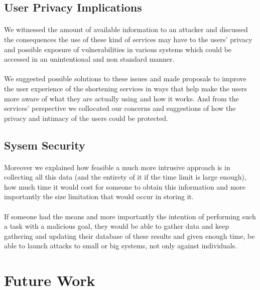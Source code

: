 \documentclass[12pt]{article}
\begin{document}
\subsection{User Privacy Implications}

\paragraph{}
We witnessed the amount of available information to an attacker and discussed the consequences the use of these kind of services may have to the users' privacy and possible exposure of vulnerabilities in various systems which could be accessed in an unintentional and non standard manner.

\paragraph{}
We suggested possible solutions to these issues and made proposals to improve the user experience of the shortening services in ways that help make the users more aware of what they are actually using and how it works. And from the services' perspective we collocated our concerns and suggestions of how the privacy and intimacy of the users could be protected.

\subsection{Sysem Security}

\paragraph{}
Moreover we explained how feasible a much more intrusive approach is in collecting all this data (and the entirety of it if the time limit is large enough), how much time it would cost for someone to obtain this information and more importantly the size limitation that would occur in storing it.

\paragraph{}
If someone had the means and more importantly the intention of performing such a task with a malicious goal, they would be able to gather data and keep gathering and updating their database of these results and given enough time, be able to launch attacks to small or big systems, not only against individuals.

\newpage
\section{Future Work}
\end{document}
